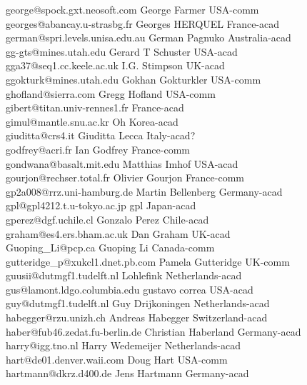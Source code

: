 \begin{tabbing}
george@spock.gxt.neosoft.com \> George Farmer \> USA-comm\\
georges@abancay.u-strasbg.fr \> Georges HERQUEL \> France-acad\\
german@spri.levels.unisa.edu.au \> German Pagnuko \> Australia-acad\\
gg-gts@mines.utah.edu \> Gerard T Schuster  \> USA-acad\\
gga37@seq1.cc.keele.ac.uk \> I.G. Stimpson \> UK-acad\\
ggokturk@mines.utah.edu \> Gokhan Gokturkler \> USA-comm\\
ghofland@sierra.com \> Gregg Hofland \>  USA-comm\\
gibert@titan.univ-rennes1.fr \> \> France-acad\\
gimul@mantle.snu.ac.kr \> Oh \> Korea-acad\\
giuditta@crs4.it \> Giuditta Lecca \>  Italy-acad?\\
godfrey@acri.fr \> Ian Godfrey \> France-comm\\
gondwana@basalt.mit.edu \> Matthias Imhof \>  USA-acad\\
gourjon@rechser.total.fr \> Olivier Gourjon \> France-comm\\
gp2a008@rrz.uni-hamburg.de \> Martin Bellenberg \> Germany-acad\\
gpl@gpl4212.t.u-tokyo.ac.jp \> gpl \> Japan-acad\\
gperez@dgf.uchile.cl \> Gonzalo Perez \> Chile-acad\\
graham@es4.ers.bham.ac.uk \> Dan Graham \> UK-acad\\
Guoping\_Li@pcp.ca \> Guoping Li \> Canada-comm\\
gutteridge\_p@xukcl1.dnet.pb.com \> Pamela Gutteridge \> UK-comm\\
guusii@dutmgf1.tudelft.nl \> Lohlefink \> Netherlands-acad\\
gus@lamont.ldgo.columbia.edu \> gustavo correa \> USA-acad\\
guy@dutmgf1.tudelft.nl \>  Guy Drijkoningen \> Netherlands-acad\\
habegger@rzu.unizh.ch \> Andreas Habegger \> Switzerland-acad\\
haber@fub46.zedat.fu-berlin.de \> Christian Haberland \> Germany-acad\\
harry@igg.tno.nl \> Harry Wedemeijer \> Netherlands-acad\\
hart@de01.denver.waii.com \> Doug Hart \> USA-comm\\
hartmann@dkrz.d400.de \> Jens Hartmann \> Germany-acad\\

\end{tabbing}
